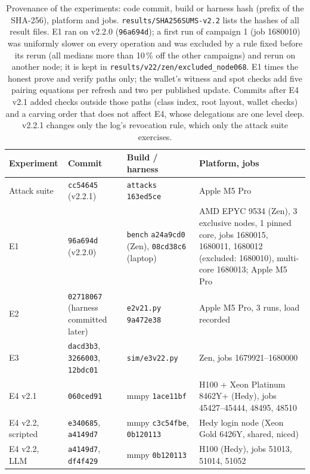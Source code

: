\documentclass[10pt]{article}
\begin{document}
\begin{table}[t]\centering\caption{Provenance of the experiments: code commit, build or harness hash (prefix of the SHA-256), platform and jobs. \texttt{results/SHA256SUMS-v2.2} lists the hashes of all result files. E1 ran on v2.2.0 (\texttt{96a694d}); a first run of campaign 1 (job 1680010) was uniformly slower on every operation and was excluded by a rule fixed before its rerun (all medians more than 10\,\% off the other campaigns) and rerun on another node; it is kept in \texttt{results/v22/zen/excluded\_node068}. E1 times the honest prove and verify paths only; the wallet's witness and spot checks add five pairing equations per refresh and two per published update. Commits after E4 v2.1 added checks outside those paths (class index, root layout, wallet checks) and a carving order that does not affect E4, whose delegations are one level deep. v2.2.1 changes only the log's revocation rule, which only the attack suite exercises.}\label{tab:prov}
\footnotesize\setlength{\tabcolsep}{3pt}
\begin{tabular}{@{}>{\raggedright\arraybackslash}p{}>{\raggedright\arraybackslash}p{}>{\raggedright\arraybackslash}p{}>{\raggedright\arraybackslash}p{}@{}}\toprule
Experiment & Commit & Build / harness & Platform, jobs\\\midrule
Attack suite & \texttt{cc54645} (v2.2.1) & \texttt{attacks} \texttt{163ed5ce} & Apple M5 Pro\\
E1 & \texttt{96a694d} (v2.2.0) & \texttt{bench} \texttt{a24a9cd0} (Zen), \texttt{08cd38c6} (laptop) & AMD EPYC 9534 (Zen), 3 exclusive nodes, 1 pinned core, jobs 1680015, 1680011, 1680012 (excluded: 1680010), multi-core 1680013; Apple M5 Pro\\
E2 & \texttt{02718067} (harness committed later) & \texttt{e2v21.py} \texttt{9a472e38} & Apple M5 Pro, 3 runs, load recorded\\
E3 & \texttt{dacd3b3}, \texttt{3266003}, \texttt{12bdc01} & \texttt{sim/e3v22.py} & Zen, jobs 1679921--1680000\\
E4 v2.1 & \texttt{060ced91} & mmpy \texttt{1ace11bf} & 1 H100 + Xeon Platinum 8462Y+ (Hedy), jobs 45427--45444, 48495, 48510\\
E4 v2.2, scripted & \texttt{e340685}, \texttt{a4149d7} & mmpy \texttt{c3c54fbe}, \texttt{0b120113} & Hedy login node (Xeon Gold 6426Y, shared, niced)\\
E4 v2.2, LLM & \texttt{a4149d7}, \texttt{df4f429} & mmpy \texttt{0b120113} & 1 H100 (Hedy), jobs 51013, 51014, 51052\\\bottomrule
\end{tabular}
\end{table}
\end{document}
